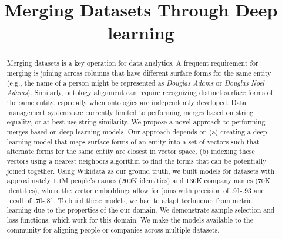 \documentclass[letterpaper]{article} %
\begin{document}
%
\title{Merging Datasets Through Deep learning}




\maketitle
\begin{abstract}
Merging datasets is a key operation for data analytics.  A frequent
requirement for merging is joining across columns that have different
surface forms for the same entity (e.g., the name of a person might be
represented as \textit{Douglas Adams} or \textit{Douglas Noel Adams}).
Similarly, ontology alignment can require recognizing distinct surface
forms of the same entity, especially when ontologies are
independently developed.  Data management systems are currently limited to performing merges based on string equality, or at best use string similarity.  We propose a novel approach to performing merges based on deep learning models.  Our approach depends on (a) creating a deep learning model that maps surface forms of an entity into a set of vectors such that alternate forms for the same entity are closest in vector space, (b) indexing these vectors using a nearest neighbors algorithm to find the forms that can be potentially joined together.  Using Wikidata as our ground truth, we built models for datasets with approximately 1.1M people's names (200K identities) and 130K company names (70K identities), where the vector embeddings allow for joins with precision of .91-.93 and recall of .70-.81. To build these models, we had to adapt techniques from metric learning due to the properties of the our domain.  We demonstrate sample selection and loss functions, which work for this domain.  We make the models available to the community for aligning people or companies across multiple datasets.
  
\end{abstract}








  
  
  
\end{document}
